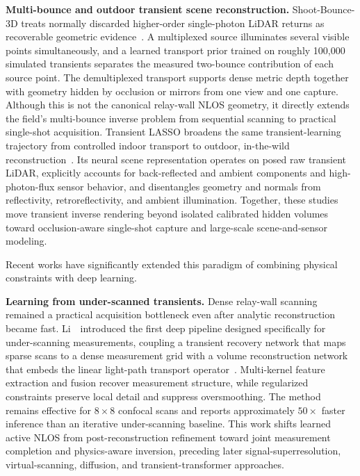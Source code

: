 \vspace{0.8mm}
\noindent \textbf{Multi-bounce and outdoor transient scene reconstruction.}
Shoot-Bounce-3D treats normally discarded higher-order single-photon LiDAR returns as recoverable geometric evidence~\cite{klinghofferShootBounce3D2025}. A multiplexed source illuminates several visible points simultaneously, and a learned transport prior trained on roughly 100,000 simulated transients separates the measured two-bounce contribution of each source point. The demultiplexed transport supports dense metric depth together with geometry hidden by occlusion or mirrors from one view and one capture. Although this is not the canonical relay-wall NLOS geometry, it directly extends the field's multi-bounce inverse problem from sequential scanning to practical single-shot acquisition. Transient LASSO broadens the same transient-learning trajectory from controlled indoor transport to outdoor, in-the-wild reconstruction~\cite{scheubleTransientLASSO2025}. Its neural scene representation operates on posed raw transient LiDAR, explicitly accounts for back-reflected and ambient components and high-photon-flux sensor behavior, and disentangles geometry and normals from reflectivity, retroreflectivity, and ambient illumination. Together, these studies move transient inverse rendering beyond isolated calibrated hidden volumes toward occlusion-aware single-shot capture and large-scale scene-and-sensor modeling.

Recent works have significantly extended this paradigm of combining physical constraints with deep learning.


\vspace{0.8mm}
\noindent \textbf{Learning from under-scanned transients.}
Dense relay-wall scanning remained a practical acquisition bottleneck even after analytic reconstruction became fast. Li~\etal~introduced the first deep pipeline designed specifically for under-scanning measurements, coupling a transient recovery network that maps sparse scans to a dense measurement grid with a volume reconstruction network that embeds the linear light-path transport operator~\cite{liDeepNLOSUnderscanning2023}. Multi-kernel feature extraction and fusion recover measurement structure, while regularized constraints preserve local detail and suppress oversmoothing. The method remains effective for $8\times8$ confocal scans and reports approximately $50\times$ faster inference than an iterative under-scanning baseline. This work shifts learned active NLOS from post-reconstruction refinement toward joint measurement completion and physics-aware inversion, preceding later signal-superresolution, virtual-scanning, diffusion, and transient-transformer approaches.

